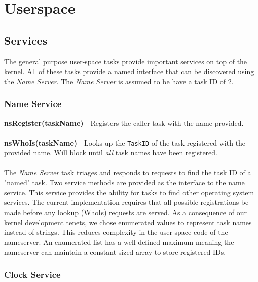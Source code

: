 \documentclass[twoside,a4paper]{refart}
\begin{document}
\section{Userspace}
\subsection{Services}
The general purpose user-space tasks provide important services on top of the kernel. All of these tasks provide a named interface that can be discovered using the \textit{Name Server}. The \textit{Name Server} is assumed to be have a task ID of 2.

\subsubsection{Name Service}

\textbf{nsRegister(taskName)} - Registers the caller task with the name provided.\\\\
\textbf{nsWhoIs(taskName)} - Looks up the \verb~TaskID~ of the task registered with the provided name. Will block until \textit{all} task names have been registered.\\\\

The \textit{Name Server} task triages and responds to requests to find the task ID of a "named" task. Two service methods are provided as the interface to the name service. This service provides the ability for tasks to find other operating system services. The current implementation requires that all possible registrations be made before any lookup (WhoIs) requests are served. As a consequence of our kernel development tenets, we chose enumerated values to represent task names instead of strings. This reduces complexity in the user space code of the nameserver. An enumerated list has a well-defined maximum meaning the nameserver can maintain a constant-sized array to store registered IDs.

\subsubsection{Clock Service}
\end{document}
